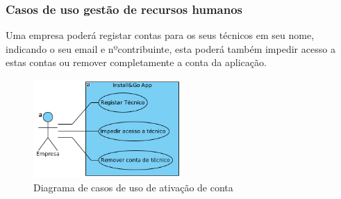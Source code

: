 
\subsubsection{Casos de uso gestão de recursos humanos}

Uma empresa poderá registar contas para os seus técnicos em seu nome, indicando o seu email e nºcontribuinte,
esta poderá também impedir acesso a estas contas ou remover completamente a conta da aplicação.

\begin{figure}[htb]
    \centering
    \includegraphics[width=0.5\textwidth]{images/diagramas/casos_de_uso/use_case_rec_humanos.png}
    \caption{Diagrama de casos de uso de ativação de conta}
    \label{fig:16}
\end{figure}